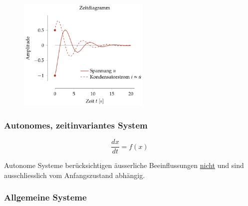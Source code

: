 \documentclass[
  10pt,
  a4paper,
  twocolumn]{article}
\numberwithin{equation}{section}
\begin{document}
\begin{figure}[H]

{\centering \includegraphics[width=6.3cm,height=\textheight]{images/state_space/time.png}

}

\end{figure}

\hypertarget{autonomes-zeitinvariantes-system}{%
\subsubsection{Autonomes, zeitinvariantes
System}\label{autonomes-zeitinvariantes-system}}

\begin{center}
\end{center}

\[
\frac{dx}{dt}=f(x)
\]

Autonome Systeme berücksichtigen äusserliche Beeinflussungen \ul{nicht}
und sind ausschliesslich vom Anfangszustand abhängig.

\hypertarget{allgemeine-systeme}{%
\subsubsection{Allgemeine Systeme}\label{allgemeine-systeme}}

\begin{center}\end{center}
\end{document}
